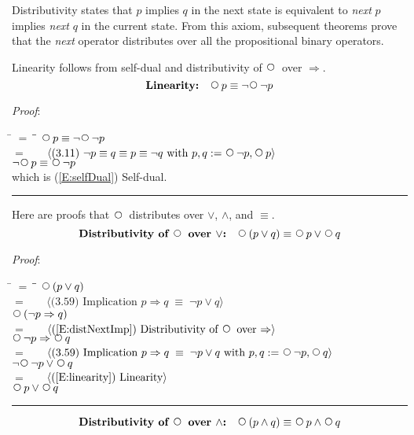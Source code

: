 \documentclass[12pt, fleqn, leqno]{article}
\newcommand{\lgap}{2pt}                             %
\newcommand{\mymathindent}{24pt}                    %
\newcommand{\equivs}{\ensuremath{\;\equiv\;}}       %
\newcommand{\impl}{\ensuremath{\Rightarrow}}        %
\newcommand{\Next}{\;\,\text{\raisebox{3.5pt}{\circle{6}}}}
\newcommand{\myqed}{\rule[-.23ex]{1.2ex}{2.0ex}}
\newcommand{\myqedtab}{\hspace{384pt}}              %
\newcommand{\Gll} {\langle}                         %
\newcommand{\Ggg} {\rangle}                         %
\newcommand{\Hint}[1]     {\ \ \ $\Gll              \mbox{#1} \Ggg$ }   %
\begin{document}
Distributivity states that $p$ implies $q$ in the next state is equivalent to \textit{next} $p$ implies \textit{next} $q$ in the current state.
From this axiom, subsequent theorems prove that the \textit{next} operator distributes over all the propositional binary operators.

Linearity follows from self-dual and distributivity of $\Next$ over $\impl$.
\begin{equation}\label{E:linearity}
\textbf{Linearity:}\quad \Next p \equiv \neg\Next\neg p
\end{equation}

\emph{Proof}:
\begin{tabbing}
\hspace{\mymathindent} \= $= \;$ \= \myqedtab \= \kill
  \> \>   $\Next p \equiv \neg\Next\neg p$\\[\lgap]
  \> $=$  \>  \Hint{(3.11) $\neg p \equiv q \equiv p \equiv \neg q$ with $p,q := \Next\neg p, \Next p$} \\[\lgap]
  \> \>   $\neg\Next p \equiv \Next\neg p$ \\[\lgap]
  \> which is (\ref{E:selfDual}) Self-dual. \quad \myqed
\end{tabbing}

Here are proofs that $\Next$ distributes over $\lor$, $\land$, and $\equiv$.
\begin{equation}\label{E:distNextOr}
\textbf{Distributivity of $\Next$ over $\lor$:}\quad \Next (p \lor q) \equiv \Next p \lor \Next q
\end{equation}

\emph{Proof}:
\begin{tabbing}
\hspace{\mymathindent} \= $= \;$ \= \myqedtab \= \kill
	\> \>   $\Next(p \lor q)$\\[\lgap]
	\> $=$  \>  \Hint{(3.59) Implication $p\impl q \equivs \neg p \lor q$}\\[\lgap]
	\> \>   $\Next(\neg p \impl q)$\\[\lgap]
	\> $=$  \>  \Hint{(\ref{E:distNextImp}) Distributivity of $\Next$ over $\impl$}\\[\lgap]
	\> \>   $\Next\neg p \impl \Next q$\\[\lgap]
	\> $=$  \>  \Hint{(3.59) Implication $p\impl q \equivs \neg p \lor q$ with $p,q := \Next\neg p, \Next q$}\\[\lgap]
	\> \>   $\neg\Next\neg p \lor \Next q$\\[\lgap]
	\> $=$  \>  \Hint{(\ref{E:linearity}) Linearity}\\[\lgap]
	\> \>   $\Next p \lor \Next q$ \quad \myqed
\end{tabbing}
\begin{equation}\label{E:distNextAnd}
\textbf{Distributivity of $\Next$ over $\land$:}\quad \Next (p \land q) \equiv \Next p \land \Next q
\end{equation}
\end{document}
